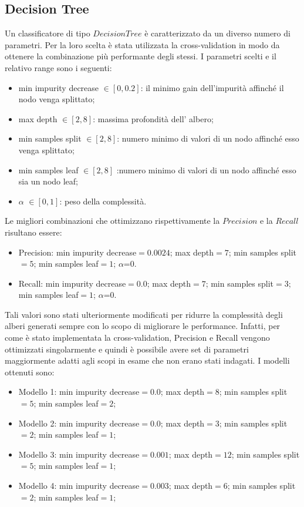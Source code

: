 \documentclass[a4paper,9pt]{article}
\begin{document}
\subsection{Decision Tree}
Un classificatore di tipo $Decision Tree$ è caratterizzato da un diverso numero di parametri. Per la loro scelta è stata utilizzata la cross-validation in modo da ottenere la combinazione più performante degli stessi. 
I parametri scelti e il relativo range sono i seguenti:

\begin{itemize}
\item min impurity decrease $ \in [0,0.2]$: il minimo gain dell'impurità affinché il nodo venga splittato;
\item max depth $ \in [2,8]$: massima profondità dell' albero;
\item min samples split $ \in [2,8]$: numero minimo di valori di un nodo affinché esso venga splittato;
\item min samples leaf $ \in [2,8]$ :numero minimo di valori di un nodo affinché esso sia un  nodo leaf;
\item $\alpha$ $ \in [0,1]$: peso della complessità.
\end{itemize}

Le migliori combinazioni che ottimizzano rispettivamente la $Precision$ e la $Recall$ risultano essere:
\begin{itemize}
\item Precision: min impurity decrease$=0.0024$; max depth$=7$; min samples split$=5$; min samples leaf$=1$; $\alpha$=$0$.
\item Recall: min impurity decrease$=0.0$; max depth$=7$; min samples split$=3$; min samples leaf$=1$; $\alpha$=$0$.
\end{itemize}

Tali valori sono stati ulteriormente modificati per ridurre la complessità degli alberi generati sempre con lo scopo di migliorare le performance. Infatti, per come è stato implementata la cross-validation, Precision e Recall vengono ottimizzati singolarmente e quindi è possibile avere set di parametri maggiormente adatti agli scopi in esame che non erano stati indagati.
I modelli ottenuti sono:
\begin{itemize}
\item Modello 1: min impurity decrease$=0.0$; max depth$=8$; min samples split$=5$; min samples leaf$=2$; 
\item Modello 2: min impurity decrease$=0.0$; max depth$=3$; min samples split$=2$; min samples leaf$=1$; 
\item Modello 3: min impurity decrease$=0.001$; max depth$=12$; min samples split$=5$; min samples leaf$=1$; 
\item Modello 4: min impurity decrease$=0.003$; max depth$=6$; min samples split$=2$; min samples leaf$=1$; 
\end{itemize}
\end{document}
